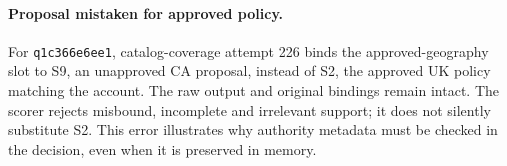 \paragraph{Proposal mistaken for approved policy.}
For \texttt{q1c366e6ee1}, catalog-coverage attempt 226 binds the approved-geography slot to S9, an unapproved CA proposal, instead of S2, the approved UK policy matching the account. The raw output and original bindings remain intact. The scorer rejects misbound, incomplete and irrelevant support; it does not silently substitute S2. This error illustrates why authority metadata must be checked in the decision, even when it is preserved in memory.
